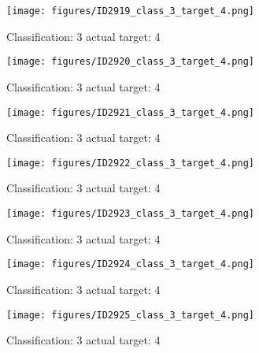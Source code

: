 \begin{figure}[h!]
\begin{center}
\texttt{[image: figures/ID2919\_class\_3\_target\_4.png]}
\end{center}
\caption{ Classification: 3 actual target: 4}
\label{fig:ID2919_class_3_target_4}
\end{figure}
\begin{figure}[h!]
\begin{center}
\texttt{[image: figures/ID2920\_class\_3\_target\_4.png]}
\end{center}
\caption{ Classification: 3 actual target: 4}
\label{fig:ID2920_class_3_target_4}
\end{figure}
\begin{figure}[h!]
\begin{center}
\texttt{[image: figures/ID2921\_class\_3\_target\_4.png]}
\end{center}
\caption{ Classification: 3 actual target: 4}
\label{fig:ID2921_class_3_target_4}
\end{figure}
\begin{figure}[h!]
\begin{center}
\texttt{[image: figures/ID2922\_class\_3\_target\_4.png]}
\end{center}
\caption{ Classification: 3 actual target: 4}
\label{fig:ID2922_class_3_target_4}
\end{figure}
\begin{figure}[h!]
\begin{center}
\texttt{[image: figures/ID2923\_class\_3\_target\_4.png]}
\end{center}
\caption{ Classification: 3 actual target: 4}
\label{fig:ID2923_class_3_target_4}
\end{figure}
\begin{figure}[h!]
\begin{center}
\texttt{[image: figures/ID2924\_class\_3\_target\_4.png]}
\end{center}
\caption{ Classification: 3 actual target: 4}
\label{fig:ID2924_class_3_target_4}
\end{figure}
\begin{figure}[h!]
\begin{center}
\texttt{[image: figures/ID2925\_class\_3\_target\_4.png]}
\end{center}
\caption{ Classification: 3 actual target: 4}
\label{fig:ID2925_class_3_target_4}
\end{figure}
